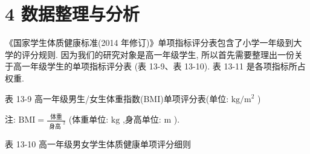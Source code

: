 \documentclass[10pt]{article}
\begin{document}
\section*{4 数据整理与分析}

《国家学生体质健康标准(2014 年修订)》单项指标评分表包含了小学一年级到大学的评分规则. 因为我们的研究对象是高一年级学生, 所以首先需要整理出一份关于高一年级学生的单项指标评分表 (表 13-9、表 13-10). 表 13-11 是各项指标所占权重.

表 13-9 高一年级男生/女生体重指数(BMI)单项评分表(单位: \(\mathrm{{kg}}/{\mathrm{m}}^{2}\) )

\begin{center}
\end{center}

注: \(\mathrm{{BMI}} = \frac{\text{ 体重 }}{{\text{ 身高 }}^{2}}\) (体重单位: \(\mathrm{{kg}}\) ,身高单位: \(\mathrm{m}\) ).

表 13-10 高一年级男女学生体质健康单项评分细则
\end{document}
